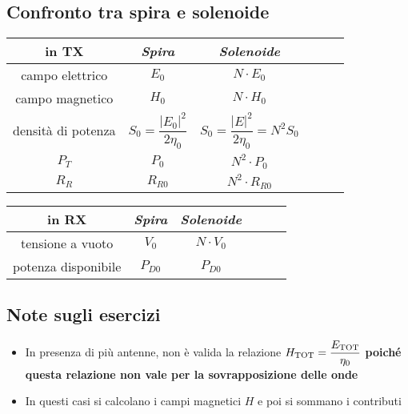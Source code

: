 \documentclass{article}
\begin{document}
\subsection{Confronto tra spira e solenoide}
\vspace{15pt}
\begin{center}
	\begin{tabular}{|Sc|Sc|Sc|}
		\hline 
		\textbf{in TX} & \textit{Spira} & \textit{Solenoide} \\ 
		\hline 	
		campo elettrico & \(E_0\) & \(N \cdot E_0\) \\ 
		\hline 
		campo magnetico & \(H_0\) & \(N \cdot H_0\) \\ 
		\hline 
		densità di potenza & \(S_0 = \dfrac{|E_0|^2}{2 \eta_0}\) & \(S_0 = \dfrac{|E|^2}{2 \eta_0} = N^2 S_0\) \\ 
		\hline 
		\(P_T\) & \(P_0\) & \(N^2 \cdot P_0\) \\ 
		\hline 
		\(R_R\) & \(R_{R0}\) & \(N^2 \cdot R_{R0}\)\\
		\hline
	\end{tabular} 
\end{center}
\vspace{5pt}
\begin{center}
	\begin{tabular}{|Sc|Sc|Sc|}
		\hline 
		\textbf{in RX} & \textit{Spira} & \textit{Solenoide} \\ 
		\hline 	
		tensione a vuoto & \(V_0\) & \(N \cdot V_0\) \\ 
		\hline 
		potenza disponibile & \(P_{D0}\) & \(P_{D0}\) \\ 
		\hline 
	\end{tabular} 
\end{center}
\vspace{5pt}

\subsection{Note sugli esercizi}
\begin{itemize}
	\item In presenza di più antenne, non è valida la relazione \( H_{\textnormal{TOT}} = \dfrac{E_{\textnormal{TOT}}}{\eta_0} \) \textbf{poiché questa relazione non vale per la sovrapposizione delle onde}
	\item In questi casi si calcolano i campi magnetici \(H\) e poi si sommano i contributi
\end{itemize}
\end{document}
